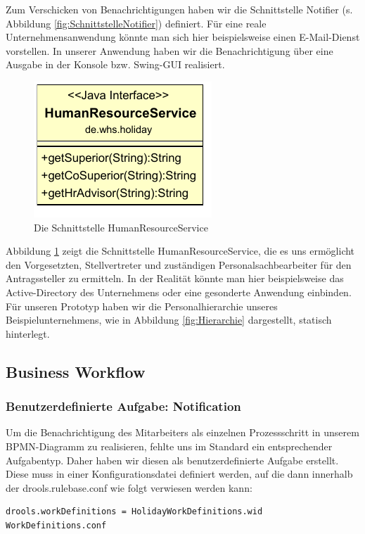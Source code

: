 Zum Verschicken von Benachrichtigungen haben wir die Schnittstelle Notifier (s. Abbildung \ref{fig:SchnittstelleNotifier}) definiert. Für eine reale Unternehmensanwendung könnte man sich hier beispielsweise einen E-Mail-Dienst vorstellen. In unserer Anwendung haben wir die Benachrichtigung über eine Ausgabe in der Konsole bzw. Swing-GUI realisiert.

\begin{figure}[H]
\centering
\includegraphics[width=0.3\linewidth]{Bilder/SchnittstelleHumanResourceService}
\caption{Die Schnittstelle HumanResourceService}
\label{fig:SchnittstelleHumanResourceService}
\end{figure}

Abbildung \ref{fig:SchnittstelleHumanResourceService} zeigt die Schnittstelle HumanResourceService, die es uns ermöglicht den Vorgesetzten, Stellvertreter und zuständigen Personalsachbearbeiter für den Antragssteller zu ermitteln. In der Realität könnte man hier beispielsweise das Active-Directory des Unternehmens oder eine gesonderte Anwendung einbinden. Für unseren Prototyp haben wir die Personalhierarchie unseres Beispielunternehmens, wie in Abbildung \ref{fig:Hierarchie} dargestellt, statisch hinterlegt.

\newpage
\subsection{Business Workflow}

\subsubsection{Benutzerdefinierte Aufgabe: Notification}
Um die Benachrichtigung des Mitarbeiters als einzelnen Prozessschritt in unserem BPMN-Diagramm zu realisieren, fehlte uns im Standard ein entsprechender Aufgabentyp. Daher haben wir diesen als benutzerdefinierte Aufgabe erstellt. Diese muss in einer Konfigurationsdatei definiert werden, auf die dann innerhalb der drools.rulebase.conf wie folgt verwiesen werden kann:
\begin{lstlisting}
drools.workDefinitions = HolidayWorkDefinitions.wid WorkDefinitions.conf
\end{lstlisting}

